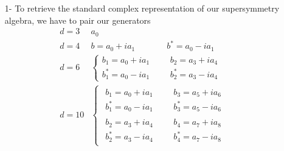 \documentclass[a4paper,12pt]{book}
\begin{document}
\begin{itemize}
\item[1-]  To retrieve the standard complex representation of our
supersymmetry algebra, we have to pair our generators 
\begin{equation}
\begin{array}{llll}
d=3 & a_{0} &  & 
\begin{array}{l}
\end{array}
\\ 
d=4 & b=a_{0}+ia_{1} & b^{*}=a_{0}-ia_{1} & 
\begin{array}{l}
\end{array}
\\ 
d=6 & \left\{ 
\begin{array}{l}
b_{1}=a_{0}+ia_{1} \\ 
b_{1}^{*}=a_{0}-ia_{1}
\end{array}
\right. & 
\begin{array}{l}
b_{2}=a_{3}+ia_{4} \\ 
b_{2}^{*}=a_{3}-ia_{4}
\end{array}
& 
\begin{array}{l}
\end{array}
\\ 
d=10 & \left\{ 
\begin{array}{c}
\begin{array}{l}
b_{1}=a_{0}+ia_{1} \\ 
b_{1}^{*}=a_{0}-ia_{1}
\end{array}
\\ 
\begin{array}{l}
b_{2}=a_{3}+ia_{4} \\ 
b_{2}^{*}=a_{3}-ia_{4}
\end{array}
\end{array}
\right. & 
\begin{array}{l}
\begin{array}{l}
b_{3}=a_{5}+ia_{6} \\ 
b_{3}^{*}=a_{5}-ia_{6}
\end{array}
\\ 
\begin{array}{l}
b_{4}=a_{7}+ia_{8} \\ 
b_{4}^{*}=a_{7}-ia_{8}
\end{array}
\end{array}
& 
\begin{array}{l}
\end{array}
\end{array}
\end{equation}

\end{itemize}
\end{document}
